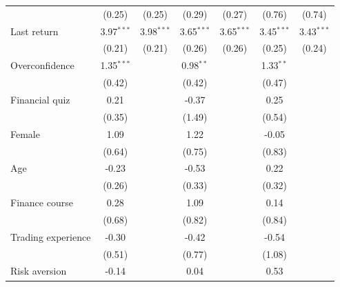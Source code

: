 \begin{tabular}{lcccccc}
                                     & (0.25)        & (0.25)        & (0.29)        & (0.27)        & (0.76)        & (0.74)\\   
   Last return                       & 3.97$^{***}$  & 3.98$^{***}$  & 3.65$^{***}$  & 3.65$^{***}$  & 3.45$^{***}$  & 3.43$^{***}$\\   
                                     & (0.21)        & (0.21)        & (0.26)        & (0.26)        & (0.25)        & (0.24)\\   
   Overconfidence                    & 1.35$^{***}$  &               & 0.98$^{**}$   &               & 1.33$^{**}$   &   \\   
                                     & (0.42)        &               & (0.42)        &               & (0.47)        &   \\   
   Financial quiz                    & 0.21          &               & -0.37         &               & 0.25          &   \\   
                                     & (0.35)        &               & (1.49)        &               & (0.54)        &   \\   
   Female                            & 1.09          &               & 1.22          &               & -0.05         &   \\   
                                     & (0.64)        &               & (0.75)        &               & (0.83)        &   \\   
   Age                               & -0.23         &               & -0.53         &               & 0.22          &   \\   
                                     & (0.26)        &               & (0.33)        &               & (0.32)        &   \\   
   Finance course                    & 0.28          &               & 1.09          &               & 0.14          &   \\   
                                     & (0.68)        &               & (0.82)        &               & (0.84)        &   \\   
   Trading experience                & -0.30         &               & -0.42         &               & -0.54         &   \\   
                                     & (0.51)        &               & (0.77)        &               & (1.08)        &   \\   
   Risk aversion                     & -0.14         &               & 0.04          &               & 0.53          &   \\   

\end{tabular}

